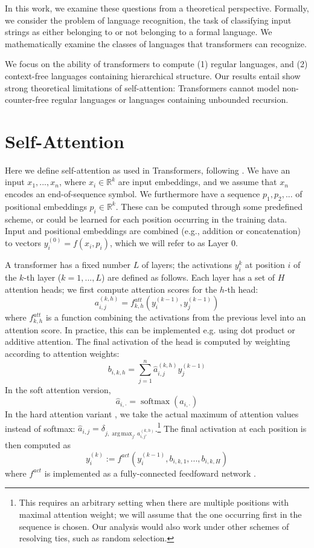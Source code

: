 \documentclass[11pt,a4paper]{article}
\DeclareMathOperator*{\argmax}{arg\,max}
\begin{document}
In this work, we examine these questions from a theoretical perspective.
Formally, we consider the problem of language recognition, the task of classifying input strings as either belonging to or not belonging to a formal language.
We mathematically examine the classes of languages that transformers can recognize.

We focus on the ability of transformers to compute (1) regular languages, and (2) context-free languages containing hierarchical structure.
Our results entail show strong theoretical limitations of self-attention:
Transformers cannot model non-counter-free regular languages or languages containing unbounded recursion.


\section{Self-Attention}
Here we define self-attention as used in Transformers, following \citet{vaswani2017attention}.
We have an input $x_1,...,x_n$, where $x_i \in \mathbb{R}^k$ are input embeddings, and we assume that $x_n$ encodes an end-of-sequence symbol.
We furthermore have a sequence $p_1, p_2, ...$ of positional embeddings $p_i \in \mathbb{R}^k$. These can be computed through some predefined scheme, or could be learned for each position occurring in the training data.
Input and positional embeddings are combined (e.g., addition or concatenation) to vectors $y_i^{(0)} = f(x_i, p_i)$, which we will refer to as Layer 0.

A transformer has a fixed number $L$ of layers; the activations $y_i^k$ at position $i$ of the $k$-th layer ($k=1, ..., L$) are defined as follows.
Each layer has a set of $H$ attention heads; we first compute attention scores for the $h$-th head:
\begin{equation}
    a_{i,j}^{(k,h)} = f^{att}_{k,h}(y_i^{(k-1)}, y_j^{(k-1)})
\end{equation}
where $f^{att}_{k,h}$ is a function combining the activations from the previous level into an attention score.
In practice, this can be implemented e.g. using dot product or additive attention.
The final activation of the head is computed by weighting according to attention weights:
\begin{equation}
    b_{i,k,h} = \sum_{j=1}^n \hat{a}_{i,j}^{(k,h)} y_j^{(k-1)}
\end{equation}
In the soft attention version,
$$ \hat{a}_{i,\cdot} = \operatorname{softmax}(a_{i,\cdot}) $$
In the hard attention variant \cite{perez2019turing} , we take the actual maximum of attention values instead of softmax:
$\hat{a}_{i,j} = \delta_{j, \argmax_{j'} a_{i,j'}^{(k,h)}}$.\footnote{This requires an arbitrary setting when there are multiple positions with maximal attention weight; we will assume that the one occurring first in the sequence is chosen. Our analysis would also work under other schemes of resolving ties, such as random selection.}
The final activation at each position is then computed as
\begin{equation}
    y_i^{(k)} := f^{act}(y_i^{(k-1)}, b_{i,k,1}, ..., b_{i,k,H})
\end{equation}
where $f^{act}$ is implemented as a fully-connected feedfoward network \cite{vaswani2017attention}.
\end{document}
